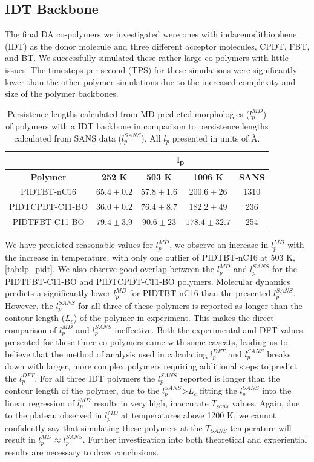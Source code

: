 \subsection{IDT Backbone}
The final DA co-polymers we investigated were ones with indacenodithiophene (IDT) as the donor molecule and three different acceptor molecules, CPDT, FBT, and BT. We successfully simulated these rather large co-polymers with little issues. The timesteps per second (TPS) for these simulations were significantly lower than the other polymer simulations due to the increased complexity and size of the polymer backbones. 
\begin{table}[ht]
    \centering
    \begin{tabular}{c|c|c|c|c}
                        &  \multicolumn{4}{c}{\textbf{l\textsubscript{p}}}  \\
        \hline
        \textbf{Polymer}  & \textbf{252 K}& \textbf{503 K}& \textbf{1006 K}& \textbf{SANS}\\
        \hline
        PIDTBT-nC16       &   $65.4\pm 0.2$     &	$57.8 \pm 1.6$&   $200.6 \pm 26$&    1310   \\
        PIDTCPDT-C11-BO   &   $36.0 \pm 0.2$    &	$76.4 \pm 8.7$&   $182.2 \pm 49$&    236	 \\
        PIDTFBT-C11-BO    &   $79.4 \pm 3.9$    &	$90.6 \pm 23$&  $178.4 \pm 32.7$    &    254	 \\
    \end{tabular}
    \caption{Persistence lengths calculated from MD predicted morphologies ($l_p^{MD}$)  of polymers with a IDT backbone in comparison to persistence lengths calculated from SANS data ($l_p^{SANS}$). All $l_p$ presented in units of \AA.}
    \label{tab:lp_pidt}
\end{table}
We have predicted reasonable values for $l_p^{MD}$, we observe an increase in $l_p^{MD}$ with the increase in temperature, with only one outlier of PIDTBT-nC16 at 503 K, \autoref{tab:lp_pidt}. We also observe good overlap between the $l_p^{MD}$ and $l_p^{SANS}$ for the PIDTFBT-C11-BO and PIDTCPDT-C11-BO polymers. Molecular dynamics predicts a significantly lower $l_p^{MD}$ for PIDTBT-nC16 than the presented $l_p^{SANS}$. However, the $l_p^{SANS}$ for all three of these polymers is reported as longer than the contour length ($L_c$) of the polymer in experiment. This makes the direct comparison of  $l_p^{MD}$ and $l_p^{SANS}$ ineffective. Both the experimental and DFT values presented for these three co-polymers came with some caveats, leading us to believe that the method of analysis used in calculating $l_p^{DFT}$ and $l_p^{SANS}$ breaks down with larger, more complex polymers requiring additional steps to predict the $l_p^{DFT}$. For all three IDT polymers the $l_p^{SANS}$ reported is longer than the contour length of the polymer, due to the $l_p^{SANS}$>$L_c$  fitting the $l_p^{SANS}$ into the linear regression of $l_p^{MD}$ results in very high, inaccurate $T_{sans}$ values. Again, due to the plateau observed in $l_p^{MD}$ at temperatures above 1200 K, we cannot confidently say that simulating these polymers at the $T_{SANS}$ temperature will result in $l_p^{MD} \approx l_p^{SANS}$. Further investigation into both theoretical and experiential results are necessary to draw conclusions. 
